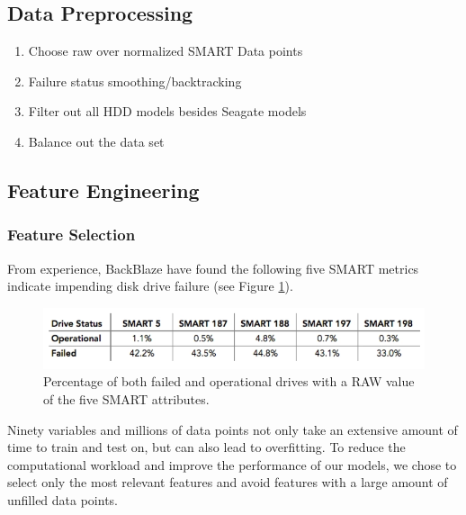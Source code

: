 \documentclass[12pt,a4paper,english]{amsart}
\begin{document}
\subsection{Data Preprocessing}







\begin{enumerate}
	\item Choose raw over normalized SMART Data points
	\item Failure status smoothing/backtracking
	\item Filter out all HDD models besides Seagate models
	\item Balance out the data set
\end{enumerate}

\subsection{Feature Engineering}

\subsubsection*{Feature Selection}


From experience, BackBlaze have found the following five SMART metrics indicate impending disk drive failure (see Figure \ref{fig:raw-fail-percentage}).

\begin{figure}[htb]
	\centering
	\includegraphics[width=\textwidth]{img/blog-smart-fail-vs-good.png}
	\caption{Percentage of both failed and operational drives with a RAW value of the five SMART attributes.}\label{fig:raw-fail-percentage}
\end{figure}

Ninety variables and millions of data points not only take an extensive amount of time to train and test on, but can also lead to overfitting. To reduce the computational workload and improve the performance of our models, we chose to select only the most relevant features and avoid features with a large amount of unfilled data points.
\end{document}
